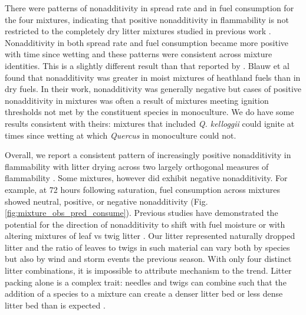 \documentclass[letterpaper,12pt]{article}
\begin{document}


There were patterns of nonadditivity in spread rate and in fuel consumption for
the four mixtures, indicating that positive nonadditivity in flammability is
not restricted to the completely dry litter mixtures studied in previous work
\citep{Magalhaes+Schwilk-2012, VanAltena+Logtestjin+etal-2012}. Nonadditivity
in both spread rate and fuel consumption became more positive with time since
wetting and these patterns were consistent across mixture identities. This is a
slightly different result than that reported by
\citet{Blauw+Wensink+etal-2015}. Blauw et al found that nonadditivity was
greater in moist mixtures of heathland fuels than in dry fuels. In their work,
nonadditivity was generally negative but cases of positive nonadditivity in
mixtures was often a result of mixtures meeting ignition thresholds not met by
the constituent species in monoculture. We do have some results consistent with
theirs: mixtures that included \emph{Q. kelloggii} could ignite at times since
wetting at which \emph{Quercus} in monoculture could not.

Overall, we report a consistent pattern of increasingly positive nonadditivity
in flammability with litter drying across two largely orthogonal measures of
flammability \citep{Schwilk-2015, Pausas+Keeley+etal-2017,
  Prior+Murphy+etal-2018}. Some mixtures, however did exhibit negative
nonadditivity. For example, at 72 hours following saturation, fuel consumption
across mixtures showed neutral, positive, or negative nonadditivity (Fig.
\ref{fig:mixture_obs_pred_consume}). Previous studies have demonstrated the
potential for the direction of nonadditivity to shift with fuel moisture
\citep{Blauw+Wensink+etal-2015} or with altering mixtures of leaf vs twig
litter \citep{Zhao+vanLogtestijn+etal-2019}. Our litter represented naturally
dropped litter and the ratio of leaves to twigs in such material can vary both
by species but also by wind and storm events the previous season. With only
four distinct litter combinations, it is impossible to attribute mechanism to
the trend. Litter packing alone is a complex trait: needles and twigs can
combine such that the addition of a species to a mixture can create a denser
litter bed or less dense litter bed than is expected
\citep{Zhao+vanLogtestijn+etal-2019}.
\end{document}
